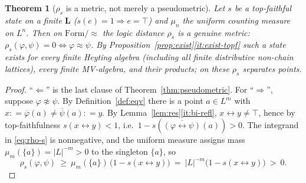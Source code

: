 \documentclass{amsart}
\theoremstyle{definition}
\theoremstyle{plain}
\newtheorem{theorem}{Theorem}
\newcommand{\eqdef}{\mathrel{\mathop:}=}
\newcommand{\bL}{\mathbf{L}}
\newcommand{\Form}{\mathrm{Form}}
\newcommand{\fbi}{\leftrightarrow}
\newcommand{\Top}{\top}
\begin{document}
\begin{theorem}[$\rho_s$ is a metric, not merely a pseudometric]\label{thm:metric}
Let $s$ be a top-faithful state on a finite $\bL$ \emph{(}$s(e)=1\Rightarrow
e=\Top$\emph{)} and $\mu_n$ the uniform counting measure on $L^n$.  Then on
$\Form/{\approx}$ the logic distance $\rho_s$ is a genuine metric:
$\rho_s(\varphi,\psi)=0\iff \varphi\approx\psi$.  By
Proposition~\ref{prop:exist}\eqref{it:exist-topf} such a state exists for every
finite Heyting algebra \emph{(}including all finite distributive non-chain
lattices\emph{)}, every finite MV-algebra, and their products; on these $\rho_s$
separates points.
\end{theorem}

\begin{proof}
``$\Leftarrow$'' is the last clause of Theorem~\ref{thm:pseudometric}.  For
``$\Rightarrow$'', suppose $\varphi\not\approx\psi$.  By
Definition~\ref{def:eqv} there is a point $a\in L^m$ with
$x\eqdef\overline\varphi(a)\ne\overline\psi(a)\eqdef y$.  By
Lemma~\ref{lem:res}\eqref{it:bi-refl}, $x\fbi y\ne\Top$, hence by top-faithfulness
$s(x\fbi y)<1$, i.e.\ $1-s(\overline{(\varphi\fbi\psi)}(a))>0$.  The integrand in
\eqref{eq:rho-s} is nonnegative, and the uniform measure assigns mass
$\mu_m(\{a\})=|L|^{-m}>0$ to the singleton $\{a\}$, so
\[
\rho_s(\varphi,\psi)\ \ge\ \mu_m(\{a\})\,\bigl(1-s(x\fbi y)\bigr)\ =\
|L|^{-m}\bigl(1-s(x\fbi y)\bigr)\ >\ 0 .
\]
\end{proof}
\end{document}
